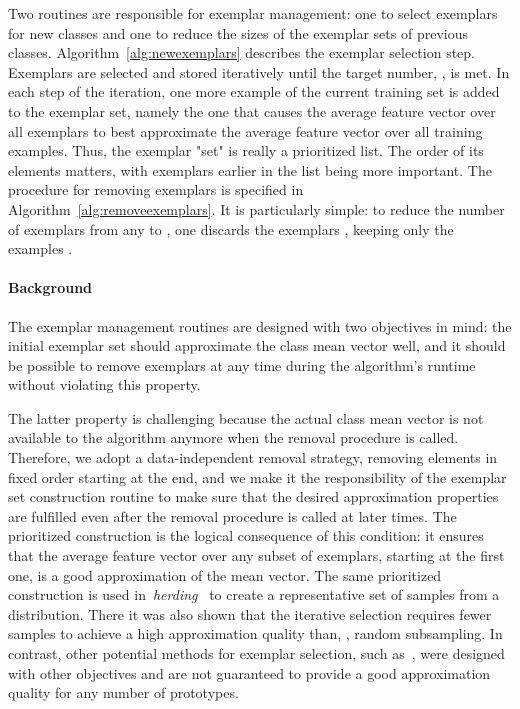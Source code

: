 \documentclass[10pt,twocolumn,letterpaper]{article}
\begin{document}
Two routines are responsible for exemplar management: one to select 
exemplars for new classes and one to reduce the sizes of the exemplar 
sets of previous classes. 
Algorithm~\ref{alg:newexemplars} describes the exemplar 
selection step. Exemplars  are selected 
and stored iteratively until the target number, , is met. 
In each step of the iteration, one more example of the 
current training set is added to the exemplar set, namely
the one that causes the average feature vector over all 
exemplars to best approximate the average feature vector 
over all training examples.
Thus, the exemplar "set" is really a prioritized list. 
The order of its elements matters, with exemplars 
earlier in the list being more important. 
The procedure for removing exemplars is specified 
in Algorithm~\ref{alg:removeexemplars}. It is 
particularly simple: 
to reduce the number of exemplars from any  to , 
one discards the exemplars , 
keeping only the examples .

\paragraph{Background\onedot} 
The exemplar management routines are designed with two objectives 
in mind: the initial exemplar set should approximate the class mean 
vector well, and it should be possible to remove exemplars at any 
time during the algorithm's runtime without violating this property.

The latter property is challenging because the actual class mean 
vector is not available to the algorithm anymore when the removal 
procedure is called. 
Therefore, we adopt a data-independent removal strategy,
removing elements in fixed order starting at the end,
and we make it the responsibility of the exemplar set 
construction routine to make sure that the desired 
approximation properties are fulfilled even after 
the removal procedure is called at later times.
The prioritized construction is the logical consequence 
of this condition: it ensures that the average feature 
vector over any subset of exemplars, starting at the 
first one, is a good approximation of the mean vector. 
The same prioritized construction is used 
in~\emph{herding}~\cite{Welling09} to create a 
representative set of samples from a distribution.
There it was also shown that the iterative selection 
requires fewer samples to achieve a high approximation 
quality than, \eg, random subsampling.
In contrast, other potential methods for exemplar 
selection, such as~\cite{elhamifar2013sparse,misra2014data},
were designed with other objectives and are not guaranteed 
to provide a good approximation quality for any number of
prototypes.
\end{document}
